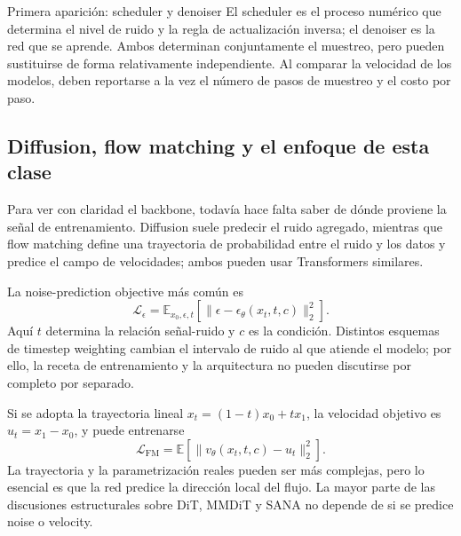 \begin{knowledgebox}{Primera aparición: scheduler y denoiser}
El scheduler es el proceso numérico que determina el nivel de ruido y la regla de actualización inversa; el denoiser es la red que se aprende. Ambos determinan conjuntamente el muestreo, pero pueden sustituirse de forma relativamente independiente. Al comparar la velocidad de los modelos, deben reportarse a la vez el número de pasos de muestreo y el costo por paso.
\end{knowledgebox}

\subsection{Diffusion, flow matching y el enfoque de esta clase}

Para ver con claridad el backbone, todavía hace falta saber de dónde proviene la señal de entrenamiento. Diffusion suele predecir el ruido agregado, mientras que flow matching define una trayectoria de probabilidad entre el ruido y los datos y predice el campo de velocidades; ambos pueden usar Transformers similares.


La noise-prediction objective más común es
\[
\mathcal L_{\epsilon}
=\mathbb E_{x_0,\epsilon,t}
\left[\|\epsilon-\epsilon_\theta(x_t,t,c)\|_2^2\right].
\]
Aquí $t$ determina la relación señal-ruido y $c$ es la condición. Distintos esquemas de timestep weighting cambian el intervalo de ruido al que atiende el modelo; por ello, la receta de entrenamiento y la arquitectura no pueden discutirse por completo por separado.


Si se adopta la trayectoria lineal $x_t=(1-t)x_0+t x_1$, la velocidad objetivo es $u_t=x_1-x_0$, y puede entrenarse
\[
\mathcal L_{\mathrm{FM}}
=\mathbb E\left[\|v_\theta(x_t,t,c)-u_t\|_2^2\right].
\]
La trayectoria y la parametrización reales pueden ser más complejas, pero lo esencial es que la red predice la dirección local del flujo. La mayor parte de las discusiones estructurales sobre DiT, MMDiT y SANA no depende de si se predice noise o velocity.


